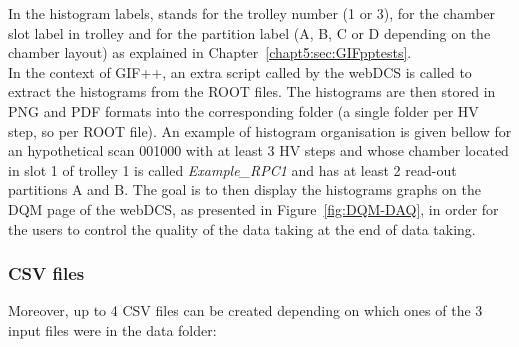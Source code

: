 	In the histogram labels,  stands for the trolley number (1 or 3),  for the chamber slot label in trolley   and  for the partition label (A, B, C or D depending on the chamber layout) as explained in Chapter~\ref{chapt5:sec:GIFpptests}.\\
	
	In the context of GIF++, an extra script called by the webDCS is called to extract the histograms from the ROOT files. The histograms are then stored in PNG and PDF formats into the corresponding folder (a single folder per HV step, so per ROOT file). An example of histogram organisation is given bellow for an hypothetical scan 001000 with at least 3 HV steps and whose chamber located in slot 1 of trolley 1 is called \textit{Example\_RPC1} and has at least 2 read-out partitions A and B. The goal is to then display the histograms graphs on the \acf{DQM} page of the webDCS, as presented in Figure~\ref{fig:DQM-DAQ}, in order for the users to control the quality of the data taking at the end of data taking.\\
	
	\vspace{5mm}
	
		\subsubsection{CSV files}
		\label{app2:sssec:CSV}

	Moreover, up to 4 CSV files can be created depending on which ones of the 3 input files were in the data folder:

